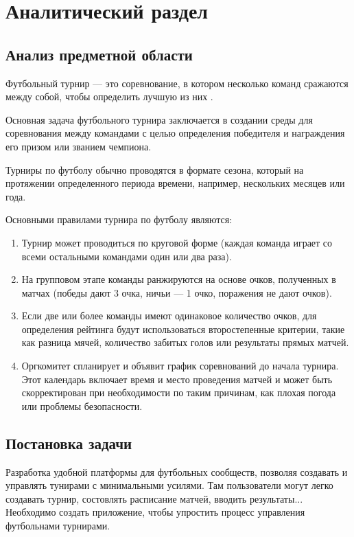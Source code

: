 \section{Аналитический раздел}


\subsection{Анализ предметной области}

Футбольный турнир --- это соревнование, в котором несколько команд сражаются между собой, чтобы определить лучшую из них \cite{raytracin}.

Основная задача футбольного турнира заключается в создании среды для соревнования между командами с целью определения победителя и награждения его призом или званием чемпиона.

Турниры по футболу обычно проводятся в формате сезона, который на протяжении определенного периода времени, например, нескольких месяцев или года.

Основными правилами турнира по футболу являются:
\begin{enumerate}[left=36pt]
	\item Турнир может проводиться по круговой форме (каждая команда играет со всеми остальными командами один или два раза).
	\item На групповом этапе команды ранжируются на основе очков, полученных в матчах (победы дают 3 очка, ничьи --- 1 очко, поражения не дают очков).
	\item Если две или более команды имеют одинаковое количество очков, для определения рейтинга будут использоваться второстепенные критерии, такие как разница мячей, количество забитых голов или результаты прямых матчей.
	\item Оргкомитет спланирует и объявит график соревнований до начала турнира. Этот календарь включает время и место проведения матчей и может быть скорректирован при необходимости по таким причинам, как плохая погода или проблемы безопасности.
\end{enumerate}
\subsection{Постановка задачи}
Разработка удобной платформы для футбольных сообществ, позволяя создавать и управлять тунирами с минимальными усилями. Там пользователи могут легко создавать турнир, состовлять расписание матчей, вводить результаты...
Необходимо создать приложение, чтобы упростить процесс управления футбольнами турнирами.

